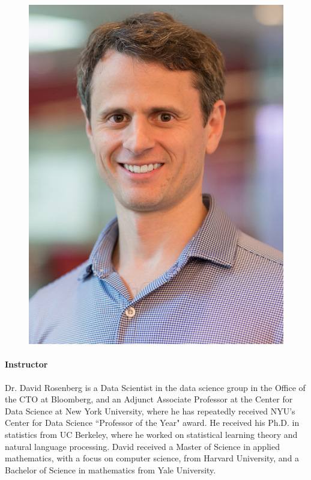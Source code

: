 \documentclass[11pt]{article}
\begin{document}
\begin{figure}
 \vspace{-25pt}
  \begin{center}
    \includegraphics[width=\linewidth]{David_Rosenberg.jpg}
  \end{center}  
  \vspace{-25pt}
\end{figure}

\paragraph{Instructor}
Dr. David Rosenberg is a Data Scientist in the data science group in the
Office of the CTO at Bloomberg, and an Adjunct Associate Professor at
the Center for Data Science at New York University, where he has
repeatedly received NYU's Center for Data Science ``Professor of the
Year" award. He received his Ph.D. in statistics from UC Berkeley,
where he worked on statistical learning theory and natural language
processing. David received a Master of Science in applied mathematics,
with a focus on computer science, from Harvard University, and a
Bachelor of Science in mathematics from Yale University.
\end{document}
